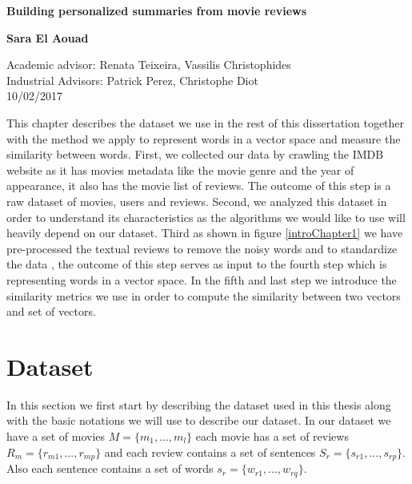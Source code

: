\documentclass{article}
\begin{document}
\begin{titlepage}
    \begin{center}
        \vspace*{1cm}
        
        \textbf{Building personalized summaries from movie reviews}
        
        \vspace{0.5cm}
       
        \vspace{1.5cm}
        
        \textbf{Sara El Aouad}
        
        \vfill
        
       
        \vspace{0.8cm}
       
        Academic advisor: Renata Teixeira, Vassilis Christophides\\
        Industrial Advisors: Patrick Perez, Christophe Diot\\
        
        10/02/2017
        
    \end{center}
\end{titlepage}
\newpage

This chapter describes the dataset we use in the rest of this dissertation together with the method we apply to represent words in a vector space and measure the similarity between words.
First, we collected our data by crawling the IMDB website as it has movies metadata like the movie genre and the year of appearance, it also has the movie list of reviews. The outcome of this step is a raw dataset of movies, users and reviews. Second, we analyzed this dataset in order to understand its characteristics as the algorithms we would like to use will heavily depend on our dataset. Third as shown in figure \ref{introChapter1} we have pre-processed the textual reviews to remove the noisy words and to standardize the data , the outcome of this step serves as input to the fourth step which is representing words in a vector space. In the fifth and last step we introduce the similarity metrics we use in order to compute the similarity between two vectors and set of vectors.
\section{Dataset}
\label{section:dataset}
In this section we first start by describing the dataset used in this thesis along with the basic notations we will use to describe our dataset. 
In our dataset we have a set of movies $M = \{m_{1},...,m_{l}\}$ each movie has a set of reviews  $R_{m} = \{r_{m1},..., r_{mp} \}$ and each review contains a set of sentences $S_{r} = \{s_{r1},..., s_{rp} \}$. Also each sentence contains a set of words $s_{r} = \{w_{r1},..., w_{rq} \}$.
\end{document}
